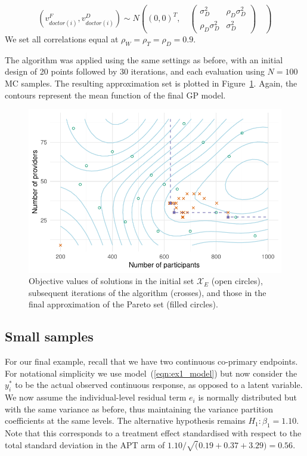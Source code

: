 \documentclass[]{sagej}
\begin{document}
$$
(v_{doctor(i)}^F, v_{doctor(i)}^D) \sim N\left( (0,0)^T, \quad
\begin{pmatrix} 
\sigma_D^2  & \rho_D \sigma_D^2  \\
\rho_D \sigma_D^2  & \sigma_D^2 
\end{pmatrix}
\quad \right)
$$
We set all correlations equal at $\rho_W = \rho_T = \rho_D = 0.9$.

The algorithm was applied using the same settings as before, with an initial design of 20 points followed by 30 iterations, and each evaluation using $N = 100$ MC samples. The resulting approximation set is plotted in Figure~\ref{fig:ex2_single_run}. Again, the contours represent the mean function of the final GP model.

\begin{figure}
\centering
\includegraphics[scale=0.8]{./Figures/ex2_single_run}
\caption{Objective values of solutions in the initial set $\mathcal{X}_{E}$ (open circles), subsequent iterations of the algorithm (crosses), and those in the final approximation of the Pareto set (filled circles).}
\label{fig:ex2_single_run}
\end{figure}

\subsection{Small samples}

For our final example, recall that we have two continuous co-primary endpoints. For notational simplicity we use model~(\ref{eqn:ex1_model}) but now consider the $y_i^*$ to be the actual observed continuous response, as opposed to a latent variable. We now assume the individual-level residual term $e_i$ is normally distributed but with the same variance as before, thus maintaining the variance partition coefficients at the same levels. The alternative hypothesis remains $H_1: \beta_1 = 1.10$. Note that this corresponds to a treatment effect standardised with respect to the total standard deviation in the APT arm of $1.10/\sqrt(0.19+0.37+3.29) = 0.56$.
\end{document}
